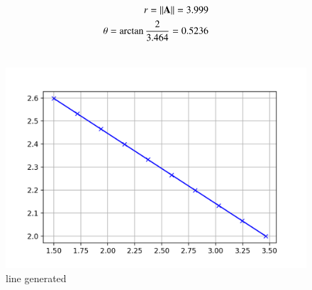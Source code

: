 \documentclass[journal,12pt,twocolumn]{IEEEtran}
\renewcommand\thesection{\arabic{section}}
\begin{document}
\begin{enumerate}[label=\thesection.\arabic*.,ref=\thesection.\theenumi]
\begin{align}
r=\lVert\mathbf{A}\rVert=3.999\\
\theta=\arctan\frac{2}{3.464}=0.5236\\\nonumber
\end{align}
 \begin{figure}[!ht]
	\centering
	\includegraphics[width=\columnwidth]{line.png}
	\caption{line generated}
	\label{fig:line}
\end{figure}

\end{enumerate}
\end{document}

